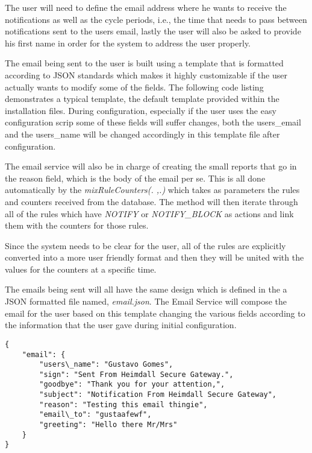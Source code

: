 The user will need to define the email address where he wants to receive the
notifications as well as the cycle periods, i.e., the time that needs to pass
between notifications sent to the users email, lastly the user will also be
asked to provide his first name in order for the system to address the user
properly.

The email being sent to the user is built using a template that is formatted
according to JSON standards which makes it highly customizable if the user
actually wants to modify some of the fields. The following code listing
demonstrates a typical template, the default template provided within the
installation files. During configuration, especially if the user uses the easy
configuration scrip some of these fields will suffer changes, both the
users\_email and the users\_name will be changed accordingly in this template
file after configuration.

The email service will also be in charge of creating the small reports that go
in the reason field, which is the body of the email per se. This is all done
automatically by the \emph{mixRuleCounters(. ,.)} which takes as parameters the
rules and counters received from the database. The method will then iterate
through all of the rules which have \emph{NOTIFY} or \emph{NOTIFY\_BLOCK} as
actions and link them with the counters for those rules.

Since the system needs to be clear for the user, all of the rules are explicitly
converted into a more user friendly format and then they will be united with the
values for the counters at a specific time.


The emails being sent will all have the same design which is defined in the a
JSON formatted file named, \emph{email.json}. The Email Service will compose the
email for the user based on this template changing the various fields according
to the information that the user gave during initial configuration.

\begin{lstlisting}[caption=Example of the email JSON template.]
{
    "email": {
        "users\_name": "Gustavo Gomes",
        "sign": "Sent From Heimdall Secure Gateway.",
        "goodbye": "Thank you for your attention,",
        "subject": "Notification From Heimdall Secure Gateway",
        "reason": "Testing this email thingie",
        "email\_to": "gustaafewf",
        "greeting": "Hello there Mr/Mrs"
    }
}
\end{lstlisting}

